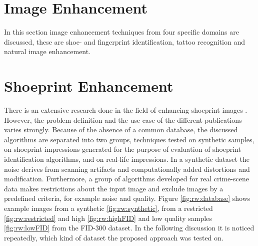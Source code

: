 \documentclass[draft,final]{vutinfth} %
\begin{document}
\section{Image Enhancement}
\label{sec:rw:ImageENhancement}

In this section image enhancement techniques from four specific domains are discussed, these are shoe- and fingerprint identification, tattoo recognition and natural image enhancement.

\section*{Shoeprint Enhancement}

\par
There is an extensive research done in the field of enhancing shoeprint images \cite{rida2019forensic}.
However,  the problem definition and the use-case of the different publications varies strongly.
Because of the absence of a common database, the discussed algorithms are separated into two groups, techniques tested on synthetic samples, on shoeprint impressions generated for the purpose of evaluation of shoeprint identification algorithms, and on real-life impressions.
In a synthetic dataset the noise derives from scanning artifacts and computationally added distortions and modification.
Furthermore, a group of algorithms developed for real crime-scene data makes restrictions about the input image and exclude images by a predefined criteria, for example noise and quality.
Figure \ref{fig:rw:database} shows example images from a synthetic \ref{fig:rw:synthetic}, from a restricted \ref{fig:rw:restricted} and high \ref{fig:rw:highFID} and low quality samples \ref{fig:rw:lowFID} from the FID-300 dataset.
In the following discussion it is noticed repeatedly, which kind of dataset the proposed approach was tested on.
\end{document}
